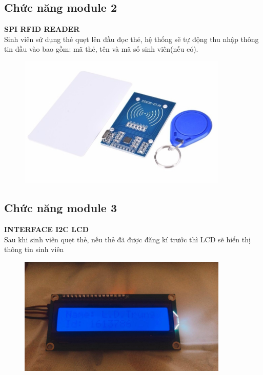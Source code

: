 \documentclass[12pt,titlepage,a4paper]{article}
\begin{document}
\subsection{Chức năng module 2}
\textbf{SPI RFID READER}\\
Sinh viên sử dụng thẻ quẹt lên đầu đọc thẻ, hệ thống sẽ tự động thu nhập thông tin đầu vào bao gồm: mã thẻ, tên và mã số sinh viên(nếu có).
\vspace{1cm}
\begin{figure}[h!]
\begin{center}
\includegraphics[width=10cm]{3.png}
\end{center}
\end{figure}
\vspace{1cm}
\subsection{Chức năng module 3}
\textbf{INTERFACE I2C LCD}\\
Sau khi sinh viên quẹt thẻ, nếu thẻ đã được đăng kí trước thì LCD sẽ hiển thị thông tin sinh viên\\

\vspace{1cm}
\begin{figure}[h!]
\begin{center}
\includegraphics[width=10cm]{4.png}
\end{center}
\end{figure}
\vspace{1cm}
\end{document}
